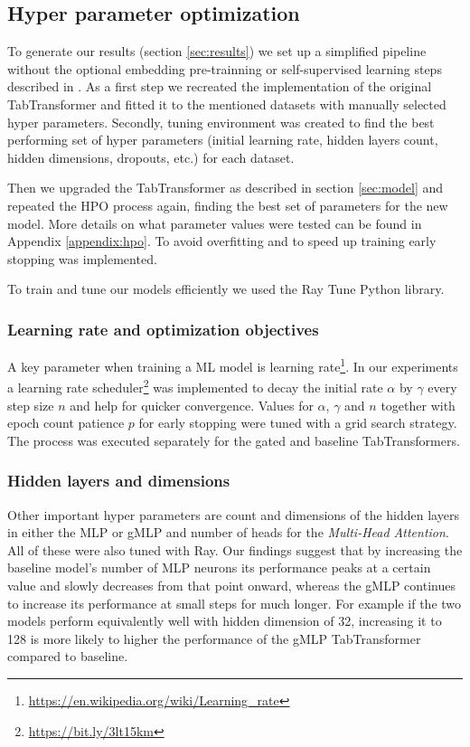 \documentclass{article}
\begin{document}
\subsection{Hyper parameter optimization}

To generate our results (section \ref{sec:results}) we set up a simplified pipeline without the optional embedding pre-trainning or self-supervised learning steps described in \cite{Huang2020TabTransformerTD}. As a first step we recreated the implementation of the original TabTransformer and fitted it to the mentioned datasets with manually selected hyper parameters. Secondly, tuning environment was created to find the best performing set of hyper parameters (initial learning rate, hidden layers count, hidden dimensions, dropouts, etc.) for each dataset.

Then we upgraded the TabTransformer as described in section \ref{sec:model} and repeated the HPO process again, finding the best set of parameters for the new model. More details on what parameter values were tested can be found in Appendix \ref{appendix:hpo}. To avoid overfitting and to speed up training early stopping was implemented.

To train and tune our models efficiently we used the Ray Tune \cite{liaw2018tune} Python library.

\subsubsection{Learning rate and optimization objectives}

A key parameter when training a ML model is learning rate\footnote{\url{https://en.wikipedia.org/wiki/Learning_rate}}. In our experiments a learning rate scheduler\footnote{\url{https://bit.ly/3lt15km}} was implemented to decay the initial rate $\alpha$ by $\gamma$ every step size $n$ and help for quicker convergence. Values for $\alpha$, $\gamma$ and $n$ together with epoch count patience $p$ for early stopping were tuned with a grid search strategy. The process was executed separately for the gated and baseline TabTransformers.

\subsubsection{Hidden layers and dimensions}

Other important hyper parameters are count and dimensions of the hidden layers in either the MLP or gMLP and number of heads for the \textit{Multi-Head Attention}. All of these were also tuned with Ray. Our findings suggest that by increasing the baseline model's number of MLP neurons its performance peaks at a certain value and slowly decreases from that point onward, whereas the gMLP continues to increase its performance at small steps for much longer. For example if the two models perform equivalently well with hidden dimension of 32, increasing it to 128 is more likely to higher the performance of the gMLP TabTransformer compared to baseline.
\end{document}
